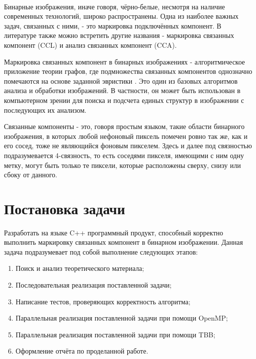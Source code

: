 \documentclass[14pt]{extarticle}
\begin{document}
\paragraph{} Бинарные изображения, иначе говоря, чёрно-белые, несмотря на наличие современных технологий, широко распространены. Одна из наиболее важных задач, связанных с ними, - это маркировка подключённых компонент. В литературе также можно встретить другие названия - маркировка связанных компонент (CCL) и анализ связанных компонент (CCA).
\par Маркировка связанных компонент в бинарных изображениях - алгоритмическое приложение теории графов, где подмножества связанных компонентов однозначно помечаются на основе заданной эвристики . Это один из базовых алгоритмов анализа и обработки изображений. В частности, он может быть использован в компьютерном зрении для поиска и подсчета единых структур в изображении с последующих их анализом.
\par Связанные компоненты - это, говоря простым языком, такие области бинарного изображения, в которых любой нефоновый пиксель помечен ровно так же, как и его сосед, тоже не являющийся фоновым пикселем. Здесь и далее под связностью подразумевается 4-связность, то есть соседями пикселя, имеющими с ним одну метку, могут быть только те пиксели, которые расположены сверху, снизу или сбоку от данного.
\newpage
\section{Постановка задачи}
\paragraph{} Разработать на языке C++ программный продукт, способный корректно выполнить маркировку связанных компонент в бинарном изображении. Данная задача подразумевает под собой выполнение следующих этапов:
\begin{enumerate}
    \item Поиск и анализ теоретического материала;
    \item Последовательная реализация поставленной задачи;
    \item Написание тестов, проверяющих корректность алгоритма;
    \item Параллельная реализация поставленной задачи при помощи OpenMP;
    \item Параллельная реализация поставленной задачи при помощи TBB;
    \item Оформление отчёта по проделанной работе.
\end{enumerate}
\newpage
\end{document}
